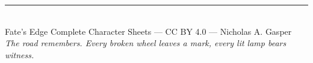 \documentclass[10pt]{article}
\begin{document}

\onecolumn
\begin{center}
    \rule{0.5\textwidth}{0.5pt}\\[1em]
    {\small Fate's Edge Complete Character Sheets --- CC BY 4.0 --- Nicholas A. Gasper}\\[0.5em]
    {\tiny \textit{The road remembers. Every broken wheel leaves a mark, every lit lamp bears witness.}}
\end{center}



\end{document}
